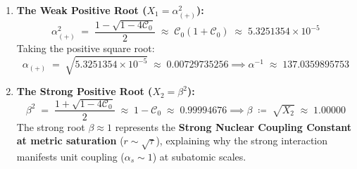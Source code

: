 \documentclass[
    12pt,
    a4paper,
    headings=normal,
    twoside=false,
    open=any,
    parskip=half
]{scrbook}
\begin{document}
\begin{enumerate}[label=(\alph*), noitemsep]
    \item \textbf{The Weak Positive Root ($X_1 = \alpha_{(+)}^2$):}
    \begin{equation}
    \alpha_{(+)}^2 \;=\; \frac{1 - \sqrt{1 - 4\mathcal{C}_0}}{2} \;\approx\; \mathcal{C}_0 \left( 1 + \mathcal{C}_0 \right) \;\approx\; 5.3251354 \times 10^{-5}
    \end{equation}
    Taking the positive square root:
    \begin{equation}
    \alpha_{(+)} \;=\; \sqrt{5.3251354 \times 10^{-5}} \;\approx\; 0.00729735256 \implies \alpha^{-1} \;\approx\; \mathbf{137.0359895753}
    \end{equation}
    \item \textbf{The Strong Positive Root ($X_2 = \beta^2$):}
    \begin{equation}
    \beta^2 \;=\; \frac{1 + \sqrt{1 - 4\mathcal{C}_0}}{2} \;\approx\; 1 - \mathcal{C}_0 \;\approx\; 0.99994676 \implies \beta \;\coloneqq\; \sqrt{X_2} \;\approx\; \mathbf{1.00000}
    \end{equation}
    The strong root $\beta \approx 1$ represents the \textbf{Strong Nuclear Coupling Constant at metric saturation} ($r \sim \sqrt{\tau}$), explaining why the strong interaction manifests unit coupling ($\alpha_s \sim 1$) at subatomic scales.
\end{enumerate}
\end{document}
